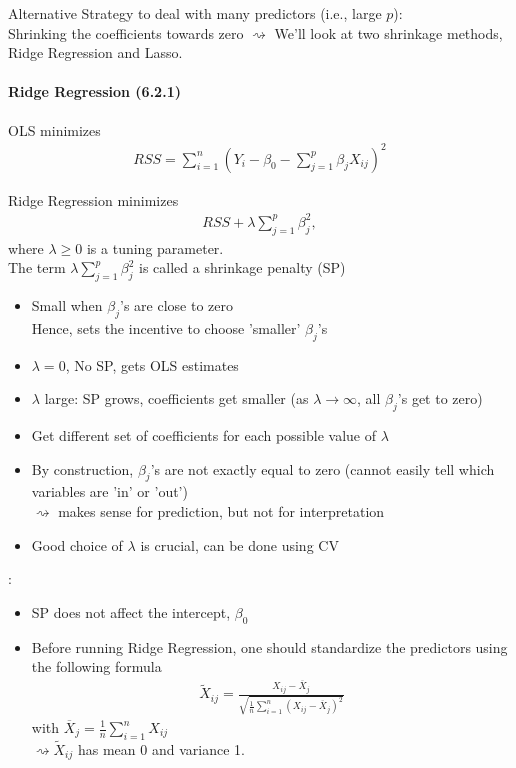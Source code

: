 \documentclass[11pt,a4paper,numbers=endperiod]{scrartcl}
\newcommand{\tit}[1]{\begin{large} \underline{\text{#1}}\end{large}}
\begin{document}
{Alternative Strategy to deal with many predictors (i.e., large $p$):\\
Shrinking the coefficients towards zero $\rightsquigarrow$ We'll look at two shrinkage methods, Ridge Regression and Lasso.\\
\newpage
\paragraph{Ridge Regression (6.2.1)}
$ $\\

OLS minimizes \begin{align*}
	RSS = \sum\limits_{i = 1}^n (Y_i - \beta_0 - \sum\limits_{j = 1}^p \beta_j X_{ij})^2
\end{align*}

Ridge Regression minimizes \begin{align*}
	 RSS + \lambda \sum_{j = 1}^p \beta_j^2,
\end{align*}
where $\lambda \geq 0$ is a tuning parameter.\\
The term $\lambda \sum\limits_{j = 1}^p \beta_j^2$ is  called a shrinkage penalty (SP)
\begin{itemize}
	\item Small when $\beta_j$'s are close to zero\\
	 Hence, sets the incentive to choose 'smaller' $\beta_j$'s
	\item $\lambda = 0$, No SP, gets OLS estimates
	\item $\lambda$ large: SP grows, coefficients get smaller (as $\lambda \rightarrow \infty$, all $\beta_j$'s get to zero)
	\item Get different set of coefficients for each possible value of $\lambda$
	\item By construction, $\beta_j$'s are not exactly equal to zero (cannot easily tell which variables are 'in' or 'out')\\
	$\rightsquigarrow$ makes sense for prediction, but not for interpretation
	\item Good choice of $\lambda$ is crucial, can be done using CV
\end{itemize}
\newpage
\tit{Implementation}: 
\begin{itemize}
	\item SP does not affect the intercept, $\beta_0$\\
	\item Before running Ridge Regression, one should standardize the predictors using the following formula \begin{align*}
		\widetilde{X}_{ij} = \frac{X_{ij} - \overline{X}_j}{\sqrt{\frac{1}{n} \sum\limits_{i = 1}^n (X_{ij} - \overline{X}_j)^2}}
	\end{align*}
	with $\overline{X}_j = \frac{1}{n} \sum\limits_{i = 1}^n X_{ij}$\\
	$\rightsquigarrow \widetilde{X}_{ij}$ has mean 0 and variance 1.
\end{itemize}

}
\end{document}
